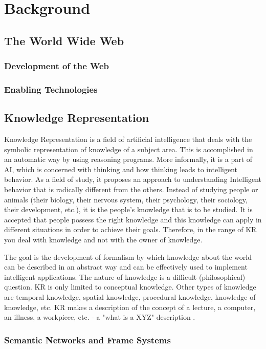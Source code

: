 \chapter{Background}
\section{The World Wide Web}
\subsection{Development of the Web}
\subsection{Enabling Technologies}
\section{Knowledge Representation}
Knowledge Representation is a field of artificial intelligence that deals with the symbolic representation of knowledge of a subject area. This is accomplished in an automatic way by using reasoning programs. More informally, it is a part of AI, which is concerned with thinking and how thinking leads to intelligent behavior. As a field of study, it proposes an approach to understanding Intelligent behavior that is radically different from the others. Instead of studying people or animals (their biology, their nervous system, their psychology, their sociology, their development, etc.), it is the people's knowledge that is to be studied. It is accepted that people possess the right knowledge and this knowledge can apply in different situations in order to achieve their goals. Therefore, in the range of KR you deal with knowledge and not with the owner of knowledge.

The goal is the development of formalism by which knowledge about the world can be described in an abstract way and can be effectively used to implement intelligent applications. The nature of knowledge is a difficult (philosophical) question. KR is only limited to conceptual knowledge. Other types of knowledge are temporal knowledge, spatial knowledge, procedural knowledge, knowledge of knowledge, etc. KR makes a description of the concept of a lecture, a computer, an illness, a workpiece, etc. - a "what is a XYZ" description .

\subsection{Semantic Networks and Frame Systems}
